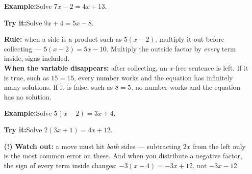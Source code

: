 \documentclass[12pt]{article}
\begin{document}
\begin{examplebox}
\textbf{Example:}\quad Solve $7x - 2 = 4x + 13$.
\end{examplebox}

\begin{tryitbox}
\textbf{Try it:}\quad Solve $9x + 4 = 5x - 8$.\\[2pt]
\end{tryitbox}


\begin{formulabox}
\textbf{Rule:} when a side is a product such as $5(x - 2)$, multiply it out before
collecting --- $5(x-2) = 5x - 10$. Multiply the outside factor by \emph{every}
term inside, signs included.\\[3pt]
\textbf{When the variable disappears:} after collecting, an $x$-free sentence is
left. If it is true, such as $15 = 15$, every number works and the equation has
infinitely many solutions. If it is false, such as $8 = 5$, no number works and
the equation has no solution.
\end{formulabox}

\begin{examplebox}
\textbf{Example:}\quad Solve $5(x - 2) = 3x + 4$.
\end{examplebox}

\begin{tryitbox}
\textbf{Try it:}\quad Solve $2(3x + 1) = 4x + 12$.\\[2pt]
\end{tryitbox}

\begin{watchoutbox}
\textbf{(!) Watch out:} a move must hit \emph{both} sides --- subtracting $2x$ from
the left only is the most common error on these. And when you distribute a
negative factor, the sign of every term inside changes:
$-3(x - 4) = -3x + 12$, not $-3x - 12$.
\end{watchoutbox}
\end{document}
